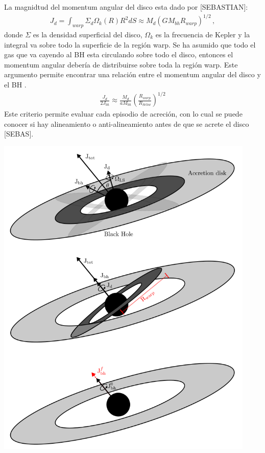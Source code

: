 La magnidtud del momentum angular del disco esta dado por [SEBASTIAN]:
%
\begin{align}
    J_{d}=\int_{warp} \Sigma_{d}\Omega_{k}(R)R^{2}dS \approx M_{d}(GM_{bh}R_{warp})^{1/2}\,,
    \label{eq: magnitid J_disco}
\end{align}
%
donde $\Sigma$ es la densidad superficial del disco, $\Omega_{k}$ es la frecuencia de Kepler y la integral va sobre todo la superficie de la región warp. Se ha asumido que todo el gas que va cayendo al BH esta circulando sobre todo el disco, entonces el momentum angular debería de distribuirse sobre toda la región warp. Este argumento permite encontrar una relación entre el momentum angular del disco y el BH \cite{king2005}.
%
\begin{align}
    \frac{J_{d}}{2J_{bh}}\approx \frac{M_{d}}{aM_{bh}}\left(\frac{R_{warp}}{R_{Schw}} \right)^{1/2}
\end{align}
%
Este criterio permite evaluar cada episodio de acreción, con lo cual se puede conocer si hay alineamiento o anti-alineamiento antes de que se acrete el disco [SEBAS]. 

\begin{center}
\includegraphics[scale=.5]{./figures/4_Modelo_Spin/evolucion_spin.png}
\label{fig: evolucion espin}
\end{center}


